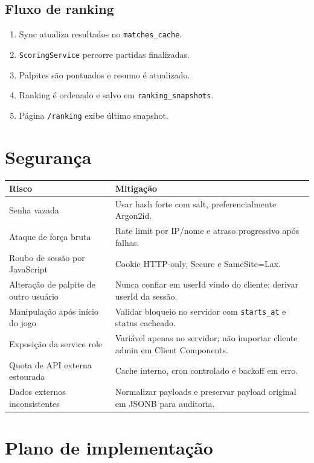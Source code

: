 \documentclass[12pt,a4paper]{article}
\begin{document}
\subsection{Fluxo de ranking}

\begin{enumerate}
  \item Sync atualiza resultados no \texttt{matches\_cache}.
  \item \texttt{ScoringService} percorre partidas finalizadas.
  \item Palpites são pontuados e resumo é atualizado.
  \item Ranking é ordenado e salvo em \texttt{ranking\_snapshots}.
  \item Página \texttt{/ranking} exibe último snapshot.
\end{enumerate}

\section{Segurança}

\begin{longtable}{p{}p{}}
\toprule
\textbf{Risco} & \textbf{Mitigação} \\
\midrule
Senha vazada & Usar hash forte com salt, preferencialmente Argon2id. \\
Ataque de força bruta & Rate limit por IP/nome e atraso progressivo após falhas. \\
Roubo de sessão por JavaScript & Cookie HTTP-only, Secure e SameSite=Lax. \\
Alteração de palpite de outro usuário & Nunca confiar em userId vindo do cliente; derivar userId da sessão. \\
Manipulação após início do jogo & Validar bloqueio no servidor com \texttt{starts\_at} e status cacheado. \\
Exposição da service role & Variável apenas no servidor; não importar cliente admin em Client Components. \\
Quota de API externa estourada & Cache interno, cron controlado e backoff em erro. \\
Dados externos inconsistentes & Normalizar payloads e preservar payload original em JSONB para auditoria. \\
\bottomrule
\end{longtable}

\section{Plano de implementação}
\end{document}
